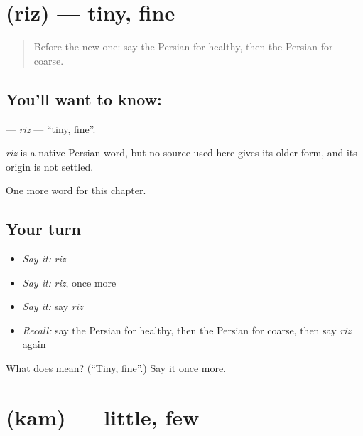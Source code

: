 \section[\texorpdfstring{\fa{ریز} (riz)}{ریز (riz)}]{ (riz) — tiny, fine}

\label{lesson:FA-C130-riz}



\begin{quote}
Before the new one: say the Persian for healthy, then the Persian for coarse.
\end{quote}

\subsection*{You'll want to know: }
\textbf{} — \emph{riz} — \textquotedblleft{}tiny, fine\textquotedblright{}.

\begin{cousinweb}
\emph{riz} is a native Persian word, but no source used here gives its older form, and its origin is not settled.
\end{cousinweb}

\begin{grammarlens}[title={What you've built}]
One more word for this chapter.
\end{grammarlens}

\subsection*{Your turn}
\begin{itemize}
\raggedright
  \item \emph{Say it:} \emph{riz}
  \item \emph{Say it:} \emph{riz}, once more
  \item \emph{Say it:} say \emph{riz}
  \item \emph{Recall:} say the Persian for healthy, then the Persian for coarse, then say \emph{riz} again
\end{itemize}

\begin{tcolorbox}[breakable,colback=teal!4,colframe=teal!35!black,title={Before you move on}]
What does  mean? (\textquotedblleft{}Tiny, fine\textquotedblright{}.) Say it once more.
\end{tcolorbox}
\section[\texorpdfstring{\fa{کم} (kam)}{کم (kam)}]{ (kam) — little, few}

